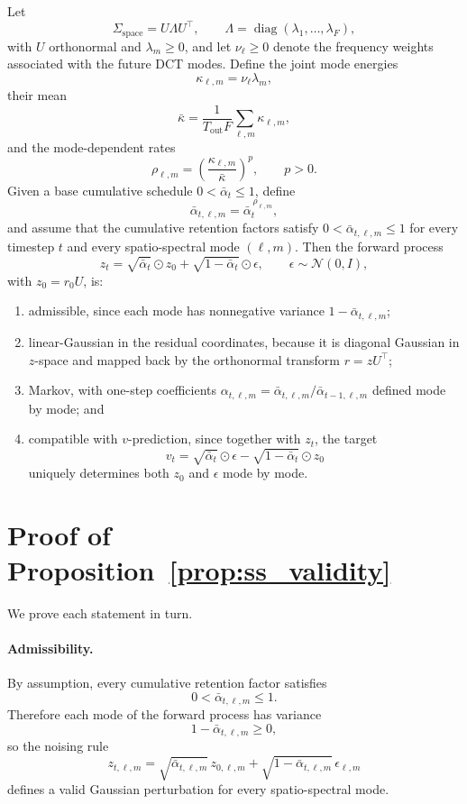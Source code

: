 \documentclass[runningheads]{llncs}
\begin{document}
\begin{proposition}
\label{prop:ss_validity}
Let
\[
\Sigma_{\mathrm{space}} = U \Lambda U^\top,
\qquad
\Lambda = \operatorname{diag}(\lambda_1,\dots,\lambda_F),
\]
with $U$ orthonormal and $\lambda_m \geq 0$, and let $\nu_\ell \geq 0$ denote the frequency weights associated with the future DCT modes. Define the joint mode energies
\[
\kappa_{\ell,m} = \nu_\ell \lambda_m,
\]
their mean
\[
\bar{\kappa}
=
\frac{1}{T_{\mathrm{out}}F}\sum_{\ell,m}\kappa_{\ell,m},
\]
and the mode-dependent rates
\[
\rho_{\ell,m}
=
\left(\frac{\kappa_{\ell,m}}{\bar{\kappa}}\right)^p,
\qquad p>0.
\]
Given a base cumulative schedule $0<\bar{\alpha}_t\leq 1$, define
\[
\bar{\alpha}_{t,\ell,m} = \bar{\alpha}_t^{\,\rho_{\ell,m}},
\]
and assume that the cumulative retention factors satisfy $0<\bar{\alpha}_{t,\ell,m}\leq 1$ for every timestep $t$ and every spatio-spectral mode $(\ell,m)$. Then the forward process
\[
z_t
=
\sqrt{\bar{\alpha}_t}\odot z_0
+
\sqrt{1-\bar{\alpha}_t}\odot \epsilon,
\qquad
\epsilon \sim \mathcal{N}(0,I),
\]
with $z_0=r_0U$, is:
\begin{enumerate}
    \item admissible, since each mode has nonnegative variance $1-\bar{\alpha}_{t,\ell,m}$;
    \item linear-Gaussian in the residual coordinates, because it is diagonal Gaussian in $z$-space and mapped back by the orthonormal transform $r=zU^\top$;
    \item Markov, with one-step coefficients $\alpha_{t,\ell,m}=\bar{\alpha}_{t,\ell,m}/\bar{\alpha}_{t-1,\ell,m}$ defined mode by mode; and
    \item compatible with $v$-prediction, since together with $z_t$, the target
    \[
    v_t
    =
    \sqrt{\bar{\alpha}_t}\odot \epsilon
    -
    \sqrt{1-\bar{\alpha}_t}\odot z_0
    \]
    uniquely determines both $z_0$ and $\epsilon$ mode by mode.
\end{enumerate}
\end{proposition}

\section{Proof of Proposition~\ref{prop:ss_validity}}

We prove each statement in turn.

\paragraph{Admissibility.}
By assumption, every cumulative retention factor satisfies
\[
0<\bar{\alpha}_{t,\ell,m}\leq 1.
\]
Therefore each mode of the forward process has variance
\[
1-\bar{\alpha}_{t,\ell,m}\geq 0,
\]
so the noising rule
\[
z_{t,\ell,m}
=
\sqrt{\bar{\alpha}_{t,\ell,m}}\,z_{0,\ell,m}
+
\sqrt{1-\bar{\alpha}_{t,\ell,m}}\,\epsilon_{\ell,m}
\]
defines a valid Gaussian perturbation for every spatio-spectral mode.
\end{document}
